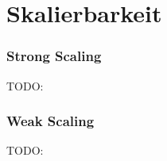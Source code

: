 \section{Skalierbarkeit}

\begin{frame}
    \frametitle{Strong Scaling}

    TODO:
\end{frame}

\begin{frame}
    \frametitle{Weak Scaling}

    TODO:
\end{frame}
